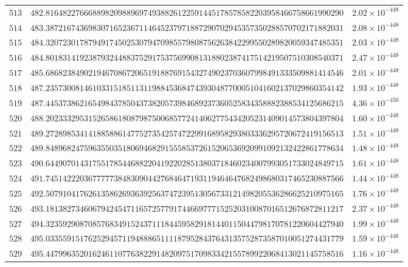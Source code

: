 \documentclass[12pt,reqno]{amsart}
\theoremstyle{remark}
\begin{document}
\begin{longtable}{clc}
$513$ & $482.8164822766688982098896974938826122591445178578582203958466758661990290$ & $2.02\times 10^{-448}$ \\
$514$ & $483.3872167436983071652367114645237971887290702945357350288570702171882031$ & $2.08\times 10^{-448}$ \\
$515$ & $484.3207230178794917450253079470985579808756263842299550289820059347485351$ & $2.03\times 10^{-448}$ \\
$516$ & $484.8018314192387932448837529175375699081318802387417514219507510308540371$ & $2.47\times 10^{-448}$ \\
$517$ & $485.6868238490219467086720651918876915432749023703607998491333509881414546$ & $2.01\times 10^{-448}$ \\
$518$ & $487.2357300814610331518511311988453684743930487700051041602137029860354142$ & $1.93\times 10^{-448}$ \\
$519$ & $487.4453738621654984378504373820573984689237360525834358882388534125686215$ & $4.36\times 10^{-450}$ \\
$520$ & $488.2023332953152658618087987500685772414062775434205231409014573804397804$ & $1.60\times 10^{-448}$ \\
$521$ & $489.2728985341418858861477527354257472299168958293803336295720672419156513$ & $1.51\times 10^{-448}$ \\
$522$ & $489.8489682475963550351806946829155585372615206536920991092132422861778634$ & $1.48\times 10^{-448}$ \\
$523$ & $490.6449070143175517854468822041922028513803718460234007993051733024849715$ & $1.61\times 10^{-448}$ \\
$524$ & $491.7451422203677777384830904427684647193119464647682498680317465230887566$ & $1.44\times 10^{-448}$ \\
$525$ & $492.5079104176261358626936392563747239513056733121498205536286625210975165$ & $1.76\times 10^{-448}$ \\
$526$ & $493.1813827346067942454711657257791744669777152520310087016512676872811217$ & $2.37\times 10^{-448}$ \\
$527$ & $494.3235929087085768349152437111844595829181440115044798170781220604427940$ & $1.99\times 10^{-448}$ \\
$528$ & $495.0335591517625294571194888651111879528437643135752873587010051274431779$ & $1.59\times 10^{-448}$ \\
$529$ & $495.4479963520162461107763822914820975170983342155789922068413021145758516$ & $1.16\times 10^{-448}$ \\

\end{longtable}
\end{document}
